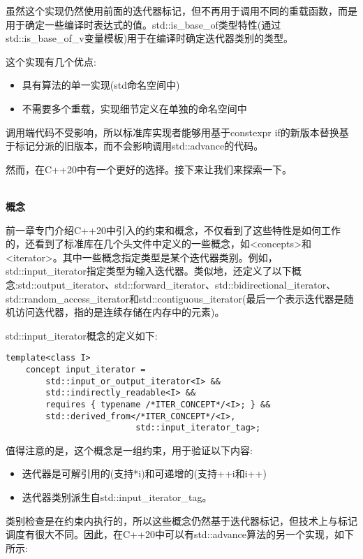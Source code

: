 虽然这个实现仍然使用前面的迭代器标记，但不再用于调用不同的重载函数，而是用于确定一些编译时表达式的值。std::is\_base\_of类型特性(通过std::is\_base\_of\_v变量模板)用于在编译时确定迭代器类别的类型。

这个实现有几个优点:

\begin{itemize}
\item
具有算法的单一实现(std命名空间中)

\item
不需要多个重载，实现细节定义在单独的命名空间中
\end{itemize}

调用端代码不受影响，所以标准库实现者能够用基于constexpr if的新版本替换基于标记分派的旧版本，而不会影响调用std::advance的代码。

然而，在C++20中有一个更好的选择。接下来让我们来探索一下。

\noindent
\hspace*{\fill} \\ %
\textbf{概念}

前一章专门介绍C++20中引入的约束和概念，不仅看到了这些特性是如何工作的，还看到了标准库在几个头文件中定义的一些概念，如<concepts>和<iterator>。其中一些概念指定类型是某个迭代器类别。例如，std::input\_iterator指定类型为输入迭代器。类似地，还定义了以下概念:std::output\_iterator、std::forward\_iterator、std::bidirectional\_iterator、std::random\_access\_iterator和std::contiguous\_iterator(最后一个表示迭代器是随机访问迭代器，指的是连续存储在内存中的元素)。

std::input\_iterator概念的定义如下:

\begin{lstlisting}[style=styleCXX]
template<class I>
	concept input_iterator =
		std::input_or_output_iterator<I> &&
		std::indirectly_readable<I> &&
		requires { typename /*ITER_CONCEPT*/<I>; } &&
		std::derived_from</*ITER_CONCEPT*/<I>,
						  std::input_iterator_tag>;
\end{lstlisting}

值得注意的是，这个概念是一组约束，用于验证以下内容:

\begin{itemize}
\item
迭代器是可解引用的(支持*i)和可递增的(支持++i和i++)

\item
迭代器类别派生自std::input\_iterator\_tag。
\end{itemize}

类别检查是在约束内执行的，所以这些概念仍然基于迭代器标记，但技术上与标记调度有很大不同。因此，在C++20中可以有std::advance算法的另一个实现，如下所示:

